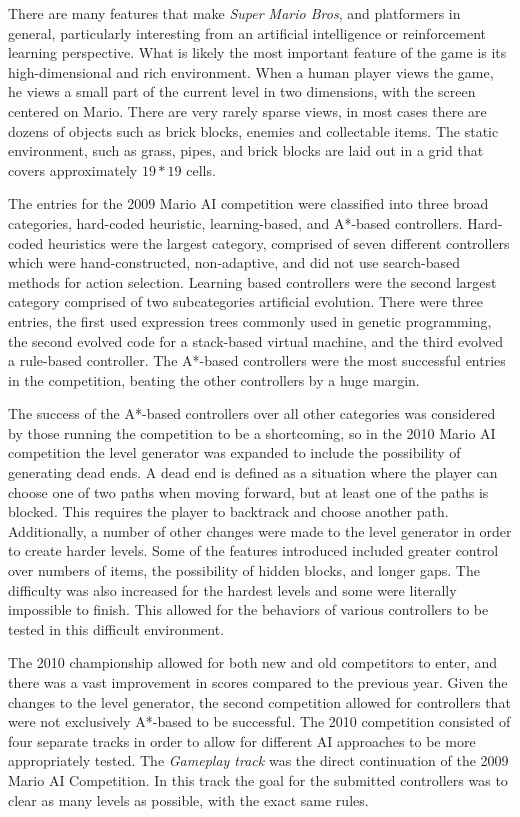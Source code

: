 \documentclass[12pt]{article}
\begin{document}
\begin{multicols}{2}
There are many features that make \textit {Super Mario Bros}, and platformers in general, particularly interesting from 
an artificial intelligence or reinforcement learning perspective. What is likely the most important feature of the game 
is its high-dimensional and rich environment. When a human player views the game, he views a small part of the 
current level in two dimensions, with the screen centered on Mario. There are very rarely sparse views, in most cases 
there are dozens of objects such as brick blocks, enemies and collectable items. The static environment, such as grass, 
pipes, and brick blocks are laid out in a grid that covers approximately $19 * 19$ cells.

The entries for the 2009 Mario AI competition were classified into three broad categories, hard-coded heuristic, 
learning-based, and A*-based controllers. Hard-coded heuristics were the largest category, comprised of seven 
different controllers which were hand-constructed, non-adaptive, and did not use search-based methods for action 
selection. Learning based controllers were the second largest category comprised of two subcategories artificial 
evolution. There were three entries, the first used expression trees commonly used in genetic programming, the 
second evolved code for a stack-based virtual machine, and the third evolved a rule-based controller. The A*-based 
controllers were the most successful entries in the competition, beating the other controllers by a huge margin.

The success of the A*-based controllers over all other categories was considered by those running the competition 
to be a shortcoming, so in the 2010 Mario AI competition the level generator was expanded to include the possibility 
of generating dead ends. A dead end is defined as a situation where the player can choose one of two paths when 
moving forward, but at least one of the paths is blocked. This requires the player to backtrack and choose another 
path. Additionally, a number of other changes were made to the level generator in order to create harder levels. 
Some of the features introduced included greater control over numbers of items, the possibility of hidden blocks, and 
longer gaps. The difficulty was also increased for the hardest levels and some were literally impossible to finish. This 
allowed for the behaviors of various controllers to be tested in this difficult environment.

The 2010 championship allowed for both new and old competitors to enter, and there was a vast improvement in scores compared to the previous year. Given the changes to the level generator, the second competition allowed for controllers that were not exclusively A*-based to be successful. The 2010 competition consisted of four separate tracks in order to allow for different AI approaches to be more appropriately tested. The \textit {Gameplay track} was the direct continuation of the 2009 Mario AI Competition. In this track the goal for the submitted controllers was to clear as many levels as possible, with the exact same rules. 


\end{multicols}
\end{document}
